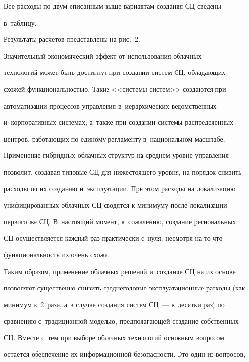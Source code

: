   

  Все расходы по двум описанным выше вариантам создания СЦ сведены 

в~таблицу.

  



     

     Результаты расчетов пред\-став\-ле\-ны на рис.~2. 





  Значительный экономический эффект от использования облачных 

технологий может быть достигнут при создании систем СЦ, обладающих 

схожей функциональностью. Такие <<системы систем>> создаются при 

автоматизации процессов управления в~иерархических ведомственных 

и~корпоративных системах, а~также при создании системы распределенных 

центров, работающих по единому регламенту в~национальном масштабе. 

Применение гибридных облачных структур на среднем уровне управления 

позволит, создавая типовые СЦ для нижестоящего уровня, на порядок снизить 

расходы по их созданию и~эксплуатации. При этом расходы на локализацию 

унифицированных облачных СЦ сводятся к минимуму после локализации 

первого же СЦ. В~настоящий момент, к~сожалению, создание региональных 

СЦ осуществляется каждый раз практически с~нуля, несмотря на то что 

функциональность их очень схожа.

  

  Таким образом, применение облачных решений и~создание СЦ на их основе 

позволяют существенно снизить среднегодовые эксплуатационные расходы (как 

минимум в~2~раза, а~в случае создания систем СЦ~--- в~десятки раз) по 

сравнению с~традиционной моделью, предполагающей создание собственных 

СЦ. Вместе с~тем при выборе облачных технологий основным вопросом 

остается обеспечение их информационной безопасности. Это один из вопросов, 


